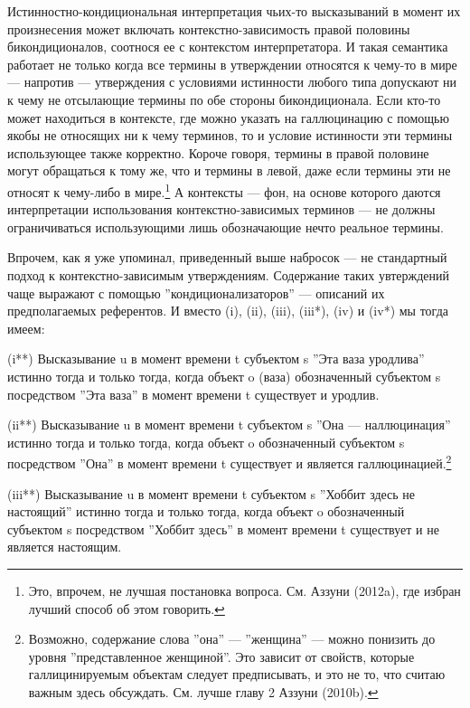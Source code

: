 \documentclass[11pt]{book}
\begin{document}
Истинностно-кондициональная интерпретация чьих-то высказываний в момент их произнесения может включать контекстно-зависимость правой половины бикондиционалов, соотнося ее с контекстом интерпретатора. И такая семантика работает не только когда все термины в утверждении относятся к чему-то в мире --- напротив --- утверждения с условиями истинности любого типа допускают ни к чему не отсылающие термины по обе стороны бикондиционала. Если кто-то может находиться в контексте, где можно указать на галлюцинацию с помощью якобы не относящих ни к чему терминов, то и условие истинности эти термины использующее также корректно. Короче говоря, термины в правой половине могут обращаться к тому же, что и термины в левой, даже если термины эти не относят к чему-либо в мире.\footnote{Это, впрочем, не лучшая постановка вопроса. См. Аззуни (2012a), где избран лучший способ об этом говорить.} А контексты --- фон, на основе которого даются интерпретации использования контекстно-зависимых терминов --- не должны ограничиваться использующими лишь обозначающие нечто реальное термины.

Впрочем, как я уже упоминал, приведенный выше набросок --- не стандартный подход к контекстно-зависимым утверждениям. Содержание таких увтерждений чаще выражают с помощью ''кондиционализаторов'' --- описаний их предполагаемых референтов. И вместо (i), (ii), (iii), (iii*), (iv) и (iv*) мы тогда имеем:

\smallskip

(i**) Высказывание u в момент времени t субъектом s ''Эта ваза уродлива'' истинно тогда и только тогда, когда объект o (ваза) обозначенный субъектом s посредством ''Эта ваза'' в момент времени t существует и уродлив.

(ii**) Высказывание u в момент времени t субъектом s ''Она --- наллюцинация'' истинно тогда и только тогда, когда объект o обозначенный субъектом s посредством ''Она'' в момент времени t существует и является галлюцинацией.\footnote{Возможно, содержание слова ''она'' --- ''женщина'' --- можно понизить до уровня ''представленное женщиной''. Это зависит от свойств, которые галлицинируемым объектам следует предписывать, и это не то, что считаю важным здесь обсуждать. См. лучше главу 2 Аззуни (2010b).}

(iii**) Высказывание u в момент времени t субъектом s ''Хоббит здесь не настоящий'' истинно тогда и только тогда, когда объект o обозначенный субъектом s посредством ''Хоббит здесь'' в момент времени t существует и не является настоящим.
\end{document}
